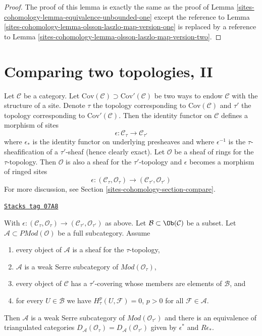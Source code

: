 \begin{proof}
The proof of this lemma is exactly the same as the proof
of Lemma \ref{sites-cohomology-lemma-equivalence-unbounded-one}
except the reference to Lemma \ref{sites-cohomology-lemma-olsson-laszlo-map-version-one}
is replaced by a reference to
Lemma \ref{sites-cohomology-lemma-olsson-laszlo-map-version-two}.
\end{proof}

\section{Comparing two topologies, II}
\label{sites-cohomology-section-compare-II}
Let $\mathcal{C}$ be a category. Let
$\text{Cov}(\mathcal{C}) \supset \text{Cov}'(\mathcal{C})$
be two ways to endow $\mathcal{C}$ with the structure of a site.
Denote $\tau$ the topology corresponding to $\text{Cov}(\mathcal{C})$
and $\tau'$ the topology corresponding to $\text{Cov}'(\mathcal{C})$.
Then the identity functor on $\mathcal{C}$ defines a morphism
of sites
$$
\epsilon : \mathcal{C}_\tau \longrightarrow \mathcal{C}_{\tau'}
$$
where $\epsilon_*$ is the identity functor on underlying presheaves and
where $\epsilon^{-1}$ is the $\tau$-sheafification of a $\tau'$-sheaf
(hence clearly exact). Let $\mathcal{O}$ be a sheaf of rings for the
$\tau$-topology. Then $\mathcal{O}$ is also a sheaf for the $\tau'$-topology
and $\epsilon$ becomes a morphism of ringed sites
$$
\epsilon :
(\mathcal{C}_\tau, \mathcal{O}_\tau)
\longrightarrow
(\mathcal{C}_{\tau'}, \mathcal{O}_{\tau'})
$$
For more discussion, see Section \ref{sites-cohomology-section-compare}.

\begin{lemma}
\label{sites-cohomology-lemma-compare-topologies-derived-adequate-modules}
\href{https://stacks.math.columbia.edu/tag/07A8}{\texttt{Stacks tag 07A8}}

With $\epsilon : (\mathcal{C}_\tau, \mathcal{O}_\tau) \to
(\mathcal{C}_{\tau'}, \mathcal{O}_{\tau'})$ as above.
Let $\mathcal{B} \subset \Ob(\mathcal{C})$ be a subset.
Let $\mathcal{A} \subset \textit{PMod}(\mathcal{O})$
be a full subcategory. Assume
\begin{enumerate}
\item every object of $\mathcal{A}$ is a sheaf for the $\tau$-topology,
\item $\mathcal{A}$ is a weak Serre subcategory of
$\textit{Mod}(\mathcal{O}_\tau)$,
\item every object of $\mathcal{C}$ has a $\tau'$-covering whose
members are elements of $\mathcal{B}$, and
\item for every $U \in \mathcal{B}$ we have $H^p_\tau(U, \mathcal{F}) = 0$,
$p > 0$ for all $\mathcal{F} \in \mathcal{A}$.
\end{enumerate}
Then $\mathcal{A}$ is a weak Serre subcategory of
$\textit{Mod}(\mathcal{O}_{\tau'})$ and there is an equivalence
of triangulated categories
$D_\mathcal{A}(\mathcal{O}_\tau) = D_\mathcal{A}(\mathcal{O}_{\tau'})$
given by $\epsilon^*$ and $R\epsilon_*$.
\end{lemma}

